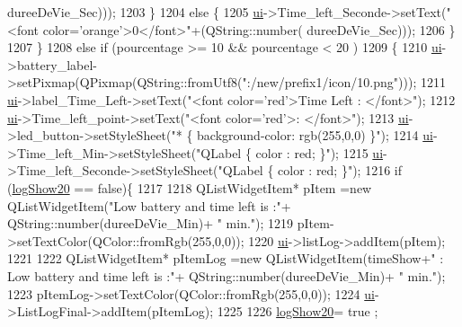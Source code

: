 \begin{DoxyCode}
{      dureeDeVie\_Sec)));
1203               \}
1204               \textcolor{keywordflow}{else} \{
1205                   \hyperlink{a00008_a6dc041ef6a2ffb329928d2913e8344e6}{ui}->Time\_left\_Seconde->setText(\textcolor{stringliteral}{"<font color='orange'>0</font>"}+(QString::number(
      dureeDeVie\_Sec)));
1206               \}
1207          \}
1208           \textcolor{keywordflow}{else} \textcolor{keywordflow}{if} (pourcentage >= 10 && pourcentage < 20 )
1209           \{
1210               \hyperlink{a00008_a6dc041ef6a2ffb329928d2913e8344e6}{ui}->battery\_label->setPixmap(QPixmap(QString::fromUtf8(\textcolor{stringliteral}{":/new/prefix1/icon/10.png"})));
1211               \hyperlink{a00008_a6dc041ef6a2ffb329928d2913e8344e6}{ui}->label\_Time\_Left->setText(\textcolor{stringliteral}{"<font color='red'>Time Left : </font>"});
1212               \hyperlink{a00008_a6dc041ef6a2ffb329928d2913e8344e6}{ui}->Time\_left\_point->setText(\textcolor{stringliteral}{"<font color='red'>: </font>"});
1213               \hyperlink{a00008_a6dc041ef6a2ffb329928d2913e8344e6}{ui}->led\_button->setStyleSheet(\textcolor{stringliteral}{"* \{ background-color: rgb(255,0,0) \}"});
1214               \hyperlink{a00008_a6dc041ef6a2ffb329928d2913e8344e6}{ui}->Time\_left\_Min->setStyleSheet(\textcolor{stringliteral}{"QLabel \{ color : red; \}"});
1215               \hyperlink{a00008_a6dc041ef6a2ffb329928d2913e8344e6}{ui}->Time\_left\_Seconde->setStyleSheet(\textcolor{stringliteral}{"QLabel \{ color : red; \}"});
1216               \textcolor{keywordflow}{if} (\hyperlink{a00008_aaa75290829eb1659effdf2bb7d0b0122}{logShow20} == \textcolor{keyword}{false})\{
1217 
1218                   QListWidgetItem* pItem =\textcolor{keyword}{new} QListWidgetItem(\textcolor{stringliteral}{"Low battery and time left is :"}+ 
      QString::number(dureeDeVie\_Min)+ \textcolor{stringliteral}{" min."});
1219                   pItem->setTextColor(QColor::fromRgb(255,0,0));
1220                   \hyperlink{a00008_a6dc041ef6a2ffb329928d2913e8344e6}{ui}->listLog->addItem(pItem);
1221 
1222                   QListWidgetItem* pItemLog =\textcolor{keyword}{new} QListWidgetItem(timeShow+\textcolor{stringliteral}{" : Low battery and time left is
       :"}+ QString::number(dureeDeVie\_Min)+ \textcolor{stringliteral}{" min."});
1223                   pItemLog->setTextColor(QColor::fromRgb(255,0,0));
1224                   \hyperlink{a00008_a6dc041ef6a2ffb329928d2913e8344e6}{ui}->ListLogFinal->addItem(pItemLog);
1225 
1226                   \hyperlink{a00008_aaa75290829eb1659effdf2bb7d0b0122}{logShow20}= true ;
}
\end{DoxyCode}
